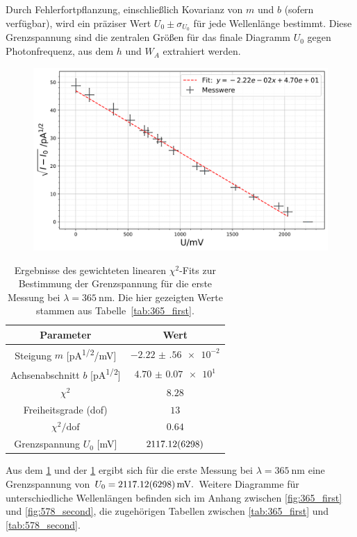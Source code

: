 Durch Fehlerfortpflanzung, einschließlich Kovarianz von $m$ und $b$ (sofern verfügbar), wird ein präziser Wert $U_{0}\pm\sigma_{U_{0}}$ für jede Wellenlänge bestimmt. Diese Grenzspannung sind die zentralen Größen für das finale Diagramm $U_{0}$ gegen Photonfrequenz, aus dem $h$ und $W_{A}$ extrahiert werden.
\FloatBarrier
\begin{figure}[H]
    \centering
    \includegraphics[width=0.95\linewidth]{figs/365_1.png}
    \label{fig:365_first_photoeff}
\end{figure}
\begin{table}[H]
  \centering
  \begin{tabular}{|c|c|}
    \hline
    \textbf{Parameter} & \textbf{Wert} \\ \hline
    Steigung $m$ [\si{\pico\ampere^{1/2}/\milli\volt}]
      & $\num{-2.22(56)e-2}$ \\ \hline
    Achsenabschnitt $b$ [\si{\pico\ampere^{1/2}}]
      & $\num{4.70(7)e1}$ \\ \hline
    $\chi^2$
      & $\num{8.28}$ \\ \hline
    Freiheitsgrade (dof)
      & $\num{13}$ \\ \hline
    $\chi^2/\mathrm{dof}$
      & $\num{0.64}$ \\ \hline
    Grenzspannung $U_0$ [\si{\milli\volt}]
      & $\num{2117.12 \pm 62.98}$ \\ \hline
  \end{tabular}
  \caption{Ergebnisse des gewichteten linearen $\chi^2$-Fits zur Bestimmung der Grenzspannung für die erste Messung bei $\lambda=\SI{365}{\nano\metre}$. Die hier gezeigten Werte stammen aus Tabelle~\ref{tab:365_first}.}
  \label{tab:365_first_chi2_photoeff}
\end{table}
\FloatBarrier
Aus dem \cref{fig:365_first_photoeff} und der \cref{tab:365_first_chi2_photoeff} ergibt sich für die erste Messung bei $\lambda = \SI{365}{\nano\meter}$ eine Grenzspannung von $U_0 = \SI{2117.12 \pm 62.98}{\milli\volt}.$ Weitere Diagramme für unterschiedliche Wellenlängen befinden sich im Anhang zwischen \cref{fig:365_first} und \cref{fig:578_second}, die zugehörigen Tabellen zwischen \cref{tab:365_first} und \cref{tab:578_second}.\\


